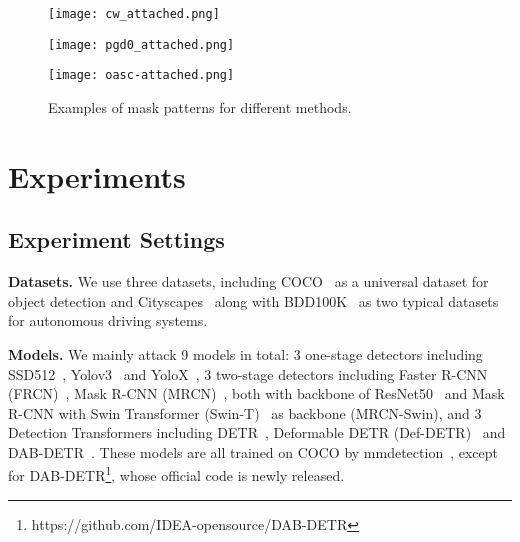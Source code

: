 \documentclass[times,twocolumn,final,authoryear]{elsarticle}
\begin{document}
\begin{figure}[]
\begin{minipage}[]{.312\linewidth}
{\begin{center}
\end{center}}
\vspace{-2ex}
\end{minipage}
\begin{minipage}[]{.312\linewidth}
{               %
\begin{center}
    \texttt{[image: cw\_attached.png]}
\end{center}}
\vspace{-2ex}
\end{minipage}
\hspace{0in}
\begin{minipage}[]{.312\linewidth}
{               %
\begin{center}
    \texttt{[image: pgd0\_attached.png]}
\end{center}}
\vspace{-2ex}
\end{minipage}
\begin{minipage}[]{.312\linewidth}
{               %
\begin{center}
  \texttt{[image: oasc-attached.png]}  
\end{center}}
\vspace{-2ex}
\end{minipage}
\caption{Examples of mask patterns for  different methods.}
\label{fig:example}
\end{figure}

\section{Experiments}
\subsection{Experiment Settings}

\textbf{Datasets.} We use three datasets, including COCO~\citep{lin2014microsoft} as a universal dataset for object detection and Cityscapes~\citep{Cordts2016Cityscapes} along with BDD100K~\citep{bdd100k} as two typical datasets for autonomous driving systems.

\textbf{Models.} We mainly attack 9 models in total: 3 one-stage detectors including SSD512~\citep{Liu_2016ssd}, Yolov3~\citep{yolov3} and YoloX~\citep{yolox2021}, 3 two-stage detectors including Faster R-CNN (FRCN)~\citep{ren2015faster}, Mask R-CNN (MRCN)~\citep{he2017mask}, both with backbone of ResNet50~\citep{he2016deep} and Mask R-CNN with Swin Transformer (Swin-T)~\citep{liu2021swin} as backbone (MRCN-Swin), and 3 Detection Transformers including DETR~\citep{carion2020detr}, Deformable DETR (Def-DETR)~\citep{zhu2020deformable} and DAB-DETR~\citep{liu2022dabdetr}. These models are all trained on COCO by mmdetection~\citep{mmdetection}, except for DAB-DETR\footnote{https://github.com/IDEA-opensource/DAB-DETR}, whose official code is newly released.
\end{document}
